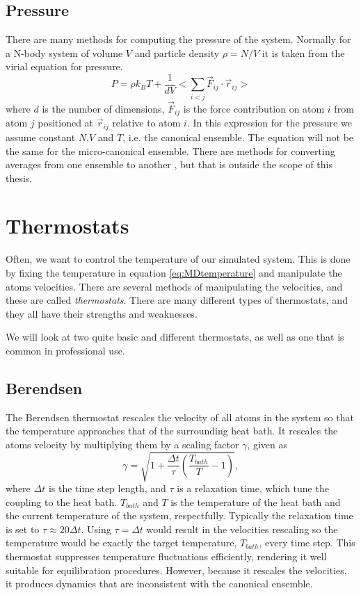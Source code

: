 \documentclass[twoside,english]{uiofysmaster}
\newcommand\lr[1]{\left(#1\right)}
\begin{document}
\subsection{Pressure}
There are many methods for computing the pressure of the system. 
Normally for a N-body system of volume $V$ and particle density $\rho=N/V$ it is taken from the virial equation for pressure. 
\begin{equation}
	P = \rho k_B T + \frac{1}{dV}\Big< \sum_{i<j} \vec{F}_{ij} \cdot \vec{r}_{ij}\Big> 
\end{equation}
where $d$ is the number of dimensions, $\vec{F}_{ij}$ is the force contribution on atom $i$ from atom $j$ positioned at $\vec{r}_{ij}$ relative to atom $i$.
In this expression for the pressure we assume constant $N$,$V$ and $T$, i.e. the canonical ensemble.
The equation will not be the same for the micro-canonical ensemble.
There are methods for converting averages from one ensemble to another \cite{Lebowitz}, but that is outside the scope of this thesis.


\section{Thermostats}\label{sec:thermostats}
Often, we want to control the temperature of our simulated system.
This is done by fixing the temperature in equation \eqref{eq:MDtemperature} and manipulate the atoms velocities.
There are several methods of manipulating the velocities, and these are called \textit{thermostats}. 
There are many different types of thermostats, and they all have their strengths and weaknesses.

We will look at two quite basic and different thermostats, as well as one that is common in professional use.   


\subsection{Berendsen}
The Berendsen thermostat rescales the velocity of all atoms in the system so that the temperature approaches that of the surrounding heat bath.
It rescales the atoms velocity by multiplying them by a scaling factor $\gamma$, given as 
\begin{equation}
\gamma = \sqrt{1+\frac{\Delta t}{\tau}\lr{\frac{T_{bath}}{T}-1}},
\end{equation}
where $\Delta t$ is the time step length, and $\tau$ is a relaxation time, which tune the coupling to the heat bath. 
$T_{bath}$ and $T$ is the temperature of the heat bath and the current temperature of the system, respectfully.
Typically the relaxation time is set to $\tau \approx 20\Delta t$. 
Using $\tau = \Delta t$ would result in the velocities rescaling so the temperature would be exactly the target temperature, $T_{bath}$, every time step. 
This thermostat suppresses temperature fluctuations efficiently, rendering it well suitable for equilibration procedures.
However, because it rescales the velocities, it produces dynamics that are inconsistent with the canonical ensemble.
\end{document}
